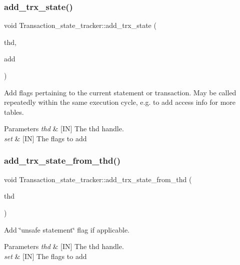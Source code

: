 \subsubsection{\texorpdfstring{add\+\_\+trx\+\_\+state()}{add\_trx\_state()}}
{\footnotesize\ttfamily void Transaction\+\_\+state\+\_\+tracker\+::add\+\_\+trx\+\_\+state (\begin{DoxyParamCaption}\item[{T\+HD $\ast$}]{thd,  }\item[{uint}]{add }\end{DoxyParamCaption})}



Add flags pertaining to the current statement or transaction. May be called repeatedly within the same execution cycle, e.\+g. to add access info for more tables. 


\begin{DoxyParams}{Parameters}
{\em thd} & \mbox{[}IN\mbox{]} The thd handle. \\
\hline
{\em set} & \mbox{[}IN\mbox{]} The flags to add \\
\hline
\end{DoxyParams}
\mbox{\label{classTransaction__state__tracker_ae374c15ed3eccd93e4d59501e70b4f9f}} 
\subsubsection{\texorpdfstring{add\+\_\+trx\+\_\+state\+\_\+from\+\_\+thd()}{add\_trx\_state\_from\_thd()}}
{\footnotesize\ttfamily void Transaction\+\_\+state\+\_\+tracker\+::add\+\_\+trx\+\_\+state\+\_\+from\+\_\+thd (\begin{DoxyParamCaption}\item[{T\+HD $\ast$}]{thd }\end{DoxyParamCaption})}



Add \char`\"{}unsafe statement\char`\"{} flag if applicable. 


\begin{DoxyParams}{Parameters}
{\em thd} & \mbox{[}IN\mbox{]} The thd handle. \\
\hline
{\em set} & \mbox{[}IN\mbox{]} The flags to add \\
\hline
\end{DoxyParams}
\mbox{\label{classTransaction__state__tracker_a919e7753e41fce01958c48146ff6eacb}} 
